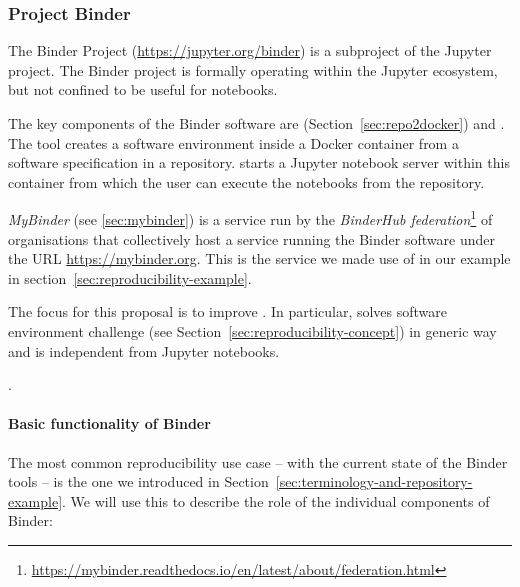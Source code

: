 \subsubsection{Project Binder}\label{seq:project-binder}

The Binder Project \cite{binder} (\url{https://jupyter.org/binder}) is
a subproject of the Jupyter project. The Binder project is formally operating
within the Jupyter ecosystem, but not confined to be useful for notebooks.

The key components of the Binder software are \repotodocker{}
(Section~\ref{sec:repo2docker}) and \binderhub{}. The \repotodocker{} tool
creates a software environment inside a Docker container from a software
specification in a repository. \binderhub{} starts a Jupyter notebook server
within this container from which the user can execute the notebooks from the
repository.

\emph{MyBinder} (see \ref{sec:mybinder}) is a service run by the \emph{BinderHub
  federation}\footnote{\url{https://mybinder.readthedocs.io/en/latest/about/federation.html}}
of organisations that collectively host a service running the Binder software
under the URL \url{https://mybinder.org}. This is the service we made use of in
our example in section~\ref{sec:reproducibility-example}.

The focus for this proposal is to improve \repotodocker{}. In particular,
\repotodocker{} solves software environment challenge (see
Section~\ref{sec:reproducibility-concept}) in generic way and is independent
from Jupyter notebooks.

.

\paragraph{Basic functionality of Binder}
\label{binder-how-does-it-work}

The most common reproducibility use case -- with the current state of the Binder
tools -- is the one we introduced in
Section~\ref{sec:terminology-and-repository-example}. We will use this to
describe the role of the individual components of Binder:

